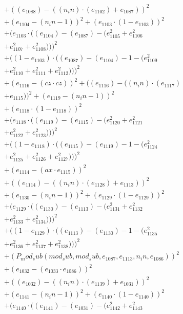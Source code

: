 \documentclass[10pt, a4paper]{article}
\begin{document}
\begin{align*}
& + ((e_{1088}) - ((n_in)  \cdot  (e_{1102}) + e_{1087}))^{2} \\
& + (e_{1104} - (n_in - 1))^{2} + (e_{1103}  \cdot  (1 - e_{1103}))^{2} \\
& + (e_{1103}  \cdot  ((e_{1104}) - (e_{1087}) - (e_{1105}^{2} + e_{1106}^{2} \\
& + e_{1107}^{2} + e_{1108}^{2})))^{2} \\
& + ((1 - e_{1103})  \cdot  ((e_{1087}) - (e_{1104}) - 1 - (e_{1109}^{2} \\
& + e_{1110}^{2} + e_{1111}^{2} + e_{1112}^{2})))^{2} \\
& + (e_{1116} - (cz  \cdot  cz))^{2} + ((e_{1116}) - ((n_in)  \cdot  (e_{1117}) \\
& + e_{1115}))^{2} + (e_{1119} - (n_in - 1))^{2} \\
& + (e_{1118}  \cdot  (1 - e_{1118}))^{2} \\
& + (e_{1118}  \cdot  ((e_{1119}) - (e_{1115}) - (e_{1120}^{2} + e_{1121}^{2} \\
& + e_{1122}^{2} + e_{1123}^{2})))^{2} \\
& + ((1 - e_{1118})  \cdot  ((e_{1115}) - (e_{1119}) - 1 - (e_{1124}^{2} \\
& + e_{1125}^{2} + e_{1126}^{2} + e_{1127}^{2})))^{2} \\
& + (e_{1114} - (ax  \cdot  e_{1115}))^{2} \\
& + ((e_{1114}) - ((n_in)  \cdot  (e_{1128}) + e_{1113}))^{2} \\
& + (e_{1130} - (n_in - 1))^{2} + (e_{1129}  \cdot  (1 - e_{1129}))^{2} \\
& + (e_{1129}  \cdot  ((e_{1130}) - (e_{1113}) - (e_{1131}^{2} + e_{1132}^{2} \\
& + e_{1133}^{2} + e_{1134}^{2})))^{2} \\
& + ((1 - e_{1129})  \cdot  ((e_{1113}) - (e_{1130}) - 1 - (e_{1135}^{2} \\
& + e_{1136}^{2} + e_{1137}^{2} + e_{1138}^{2})))^{2} \\
& + (P_mod_sub(mod_sub, mod_sub, e_{1087}, e_{1113}, n_in, e_{1086}))^{2} \\
& + (e_{1032} - (e_{1033}  \cdot  e_{1086}))^{2} \\
& + ((e_{1032}) - ((n_in)  \cdot  (e_{1139}) + e_{1031}))^{2} \\
& + (e_{1141} - (n_in - 1))^{2} + (e_{1140}  \cdot  (1 - e_{1140}))^{2} \\
& + (e_{1140}  \cdot  ((e_{1141}) - (e_{1031}) - (e_{1142}^{2} + e_{1143}^{2} \\

\end{align*}
\end{document}
